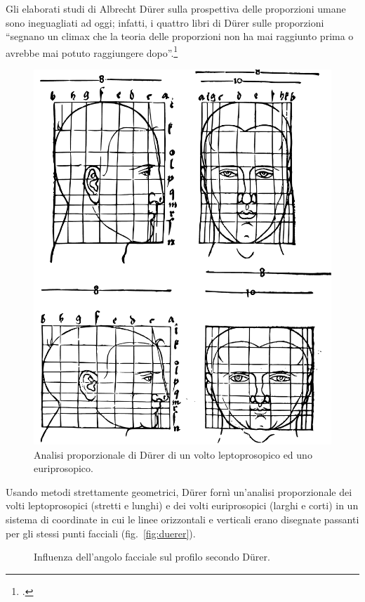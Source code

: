 Gli elaborati studi di Albrecht Dürer sulla prospettiva delle proporzioni umane sono ineguagliati ad oggi; infatti, i quattro libri di Dürer sulle proporzioni ``segnano un climax che la teoria delle proporzioni non ha mai raggiunto prima o avrebbe mai potuto raggiungere dopo''.\footcite{Panofsky1974}

\begin{figure}
\centering
\includegraphics[width=.4\textwidth]{./images/duerer-proportional.pdf}
\caption{Analisi proporzionale di Dürer di un volto leptoprosopico ed uno euriprosopico.}
\label{fig:duerer}
\end{figure}

Usando metodi strettamente geometrici, Dürer fornì un'analisi proporzionale dei volti leptoprosopici (stretti e lunghi) e dei volti euriprosopici (larghi e corti) in un sistema di coordinate in cui le linee orizzontali e verticali erano disegnate passanti per gli stessi punti facciali (fig.~\vref{fig:duerer}).

\begin{figure}
\centering
{}
\caption{Influenza dell'angolo facciale sul profilo secondo Dürer.}
\label{fig:duerer2}
\end{figure}

